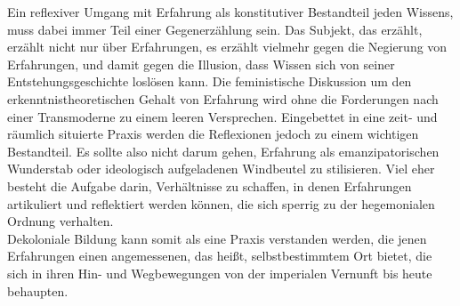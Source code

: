 \noindent Ein reflexiver Umgang mit Erfahrung als konstitutiver Bestandteil jeden Wissens,
muss dabei immer Teil einer Gegenerzählung sein. Das Subjekt, das erzählt,
erzählt nicht nur über Erfahrungen, es erzählt vielmehr gegen die Negierung von
Erfahrungen, und damit gegen die Illusion, dass Wissen sich von seiner
Entstehungsgeschichte loslösen kann. Die feministische Diskussion um den
erkenntnistheoretischen Gehalt von Erfahrung wird ohne die Forderungen nach
einer Transmoderne zu einem leeren Versprechen. Eingebettet in eine zeit- und
räumlich situierte Praxis werden die Reflexionen jedoch zu einem wichtigen
Bestandteil. Es sollte also nicht darum gehen, Erfahrung als emanzipatorischen
Wunderstab oder ideologisch aufgeladenen Windbeutel zu stilisieren. Viel eher
besteht die Aufgabe darin, Verhältnisse zu schaffen, in denen Erfahrungen
artikuliert und reflektiert werden können, die sich sperrig zu der hegemonialen
Ordnung verhalten.  \\
Dekoloniale Bildung kann somit als eine Praxis verstanden
werden, die jenen Erfahrungen einen angemessenen, das heißt, selbstbestimmtem
Ort bietet,  die sich in ihren Hin- und Wegbewegungen von der imperialen
Vernunft bis heute behaupten.


